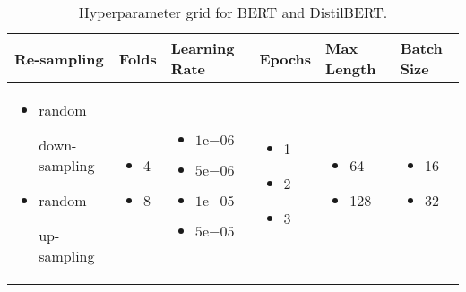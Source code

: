 \begin{table}[htpb]
    \centering
    \begin{tabular}{ p{3.5cm} p{1.5cm} p{2cm} p{1.5cm} p{1.6cm} p{1.5cm} }
        \toprule
         Re-sampling & Folds & Learning Rate & Epochs & Max Length & Batch Size \\
        \midrule
            \begin{itemize}[noitemsep,topsep=0pt,leftmargin=15pt]
                \item {random

                down-sampling}
                \item {random

                up-sampling}
            \end{itemize}
            &\begin{itemize}[noitemsep,topsep=0pt,leftmargin=15pt]
                \item 4
                \item 8
            \end{itemize}
            & \begin{itemize}[noitemsep,topsep=0pt,leftmargin=15pt]
                \item $1\mathrm{e}{-06}$
                \item $5\mathrm{e}{-06}$
                \item $1\mathrm{e}{-05}$
                \item $5\mathrm{e}{-05}$
            \end{itemize}
            & \begin{itemize}[noitemsep,topsep=0pt,leftmargin=15pt]
                \item 1
                \item 2
                \item 3
            \end{itemize}
            & \begin{itemize}[noitemsep,topsep=0pt,leftmargin=15pt]
                \item 64
                \item 128
            \end{itemize}
            & \begin{itemize}[noitemsep,topsep=0pt,leftmargin=15pt]
                \item 16
                \item 32
            \end{itemize}\\
        \bottomrule
    \end{tabular}
    \caption[Hyperparameter Grid for \ac{BERT} and \ac{DistilBERT}]{Hyperparameter grid for \ac{BERT} and \ac{DistilBERT}.}\label{tab:study:execution:paramter_grid:BERT}
\end{table}

